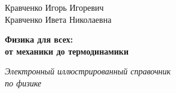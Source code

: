 \begin{titlepage}
    \begin{center}
        \vspace*{0.5cm}
        
        \Large
        Кравченко Игорь Игоревич\\
        Кравченко Ивета Николаевна
        
        \vspace{1cm}
        \Huge
        \textbf{Физика для всех:\\
        от механики до термодинамики}
        
        \vspace{1.5cm}
        
        \vfill
        \Large
        \textit{Электронный иллюстрированный справочник\\
        по физике}
        
        \vspace{15cm}

    \end{center}
\end{titlepage}